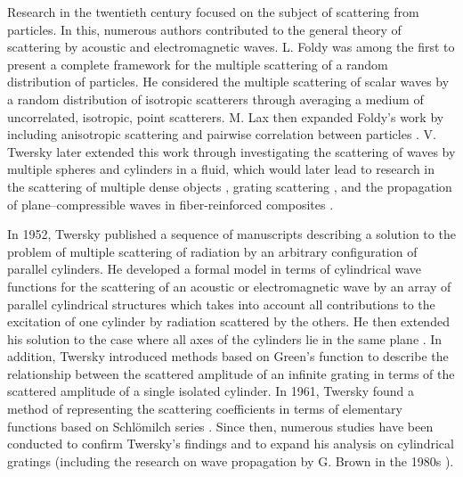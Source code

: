 \vspace{-18mm}
Research in the twentieth century focused on the subject of scattering from particles. In this, numerous authors contributed to the general theory of scattering by acoustic and electromagnetic waves. L. Foldy was among the first to present a complete framework \cite{foldy1945multiple} for the multiple scattering of a random distribution of particles. He considered the multiple scattering of scalar waves by a random distribution of isotropic scatterers through averaging a medium of uncorrelated, isotropic, point scatterers. M. Lax then expanded Foldy's work by including anisotropic scattering and pairwise correlation between particles \cite{lax1951multiple}. V. Twersky later extended this work through investigating the scattering of waves by multiple spheres and cylinders in a fluid, which would later lead to research in the scattering of multiple dense objects \cite{fikioris1964multiple,waterman1961multiple}, grating scattering \cite{twersky1973multiple}, and the propagation of plane--compressible waves in fiber-reinforced composites \cite{varadan1978multiple,sheng2007introduction,tsang2004scattering}. 

In 1952, Twersky published a sequence of manuscripts \cite{twersky1952multiple,twersky1952multipleb,twersky1952multiplec} describing a solution to the problem of multiple scattering of radiation by an arbitrary configuration of parallel cylinders. He developed a formal model in terms of cylindrical wave functions for the scattering of an acoustic or electromagnetic wave by an array of parallel cylindrical structures which takes into account all contributions to the excitation of one cylinder by radiation scattered by the others. He then extended his solution to the case where all axes of the cylinders lie in the same plane \cite{kavakliouglu2012exact}. In addition, Twersky introduced methods based on Green's function \cite{twersky1956scatttering} to describe the relationship between the scattered amplitude of an infinite grating in terms of the scattered amplitude of a single isolated cylinder. In 1961, Twersky found a method of representing the scattering coefficients in terms of elementary functions based on Schl{\"o}milch series \cite{twersky1961elementary}. Since then, numerous studies have been conducted to confirm Twersky's findings and to expand his analysis on cylindrical gratings (including the research on wave propagation by G. Brown in the 1980s \cite{brown1980coherent,brown1981alternate}).


